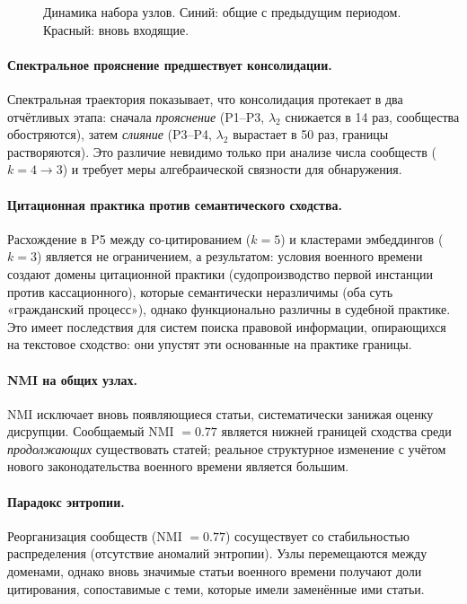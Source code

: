 \documentclass[11pt]{article}
\begin{document}
\begin{figure}[t]
\centering

\caption{Динамика набора узлов. Синий: общие с предыдущим периодом. Красный: вновь входящие.}
\label{fig:node_dynamics}
\end{figure}

\paragraph{Спектральное прояснение предшествует консолидации.}
Спектральная траектория показывает, что консолидация протекает в два отчётливых этапа: сначала \emph{прояснение} (P1--P3, $\lambda_2$ снижается в 14 раз, сообщества обостряются), затем \emph{слияние} (P3--P4, $\lambda_2$ вырастает в 50 раз, границы растворяются).
Это различие невидимо только при анализе числа сообществ ($k = 4 \to 3$) и требует меры алгебраической связности для обнаружения.

\paragraph{Цитационная практика против семантического сходства.}
\begin{sloppypar}
Расхождение в P5 между со-цитированием ($k=5$) и кластерами эмбеддингов ($k=3$) является не ограничением, а результатом: условия военного времени создают домены цитационной практики (судопроизводство первой инстанции против кассационного), которые семантически неразличимы (оба суть «гражданский процесс»), однако функционально различны в судебной практике.
Это имеет последствия для систем поиска правовой информации, опирающихся на текстовое сходство: они упустят эти основанные на практике границы.
\end{sloppypar}

\paragraph{NMI на общих узлах.}
NMI исключает вновь появляющиеся статьи, систематически занижая оценку дисрупции.
Сообщаемый NMI $= 0.77$ является нижней границей сходства среди \emph{продолжающих} существовать статей; реальное структурное изменение с учётом нового законодательства военного времени является большим.

\paragraph{Парадокс энтропии.}
Реорганизация сообществ (NMI $= 0.77$) сосуществует со стабильностью распределения (отсутствие аномалий энтропии).
Узлы перемещаются между доменами, однако вновь значимые статьи военного времени получают доли цитирования, сопоставимые с теми, которые имели заменённые ими статьи.
\end{document}
